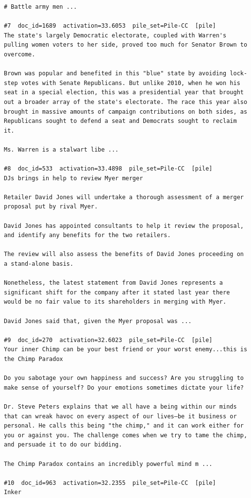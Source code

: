 \begin{verbatim}
# Battle army men ...

#7  doc_id=1689  activation=33.6053  pile_set=Pile-CC  [pile]
The state's largely Democratic electorate, coupled with Warren's pulling women voters to her side, proved too much for Senator Brown to overcome.

Brown was popular and benefited in this "blue" state by avoiding lock-step votes with Senate Republicans. But unlike 2010, when he won his seat in a special election, this was a presidential year that brought out a broader array of the state's electorate. The race this year also brought in massive amounts of campaign contributions on both sides, as Republicans sought to defend a seat and Democrats sought to reclaim it.

Ms. Warren is a stalwart libe ...

#8  doc_id=533  activation=33.4898  pile_set=Pile-CC  [pile]
DJs brings in help to review Myer merger

Retailer David Jones will undertake a thorough assessment of a merger proposal put by rival Myer.

David Jones has appointed consultants to help it review the proposal, and identify any benefits for the two retailers.

The review will also assess the benefits of David Jones proceeding on a stand-alone basis.

Nonetheless, the latest statement from David Jones represents a significant shift for the company after it stated last year there would be no fair value to its shareholders in merging with Myer.

David Jones said that, given the Myer proposal was ...

#9  doc_id=270  activation=32.6023  pile_set=Pile-CC  [pile]
Your inner Chimp can be your best friend or your worst enemy...this is the Chimp Paradox

Do you sabotage your own happiness and success? Are you struggling to make sense of yourself? Do your emotions sometimes dictate your life?

Dr. Steve Peters explains that we all have a being within our minds that can wreak havoc on every aspect of our lives—be it business or personal. He calls this being "the chimp," and it can work either for you or against you. The challenge comes when we try to tame the chimp, and persuade it to do our bidding.

The Chimp Paradox contains an incredibly powerful mind m ...

#10  doc_id=963  activation=32.2355  pile_set=Pile-CC  [pile]
Inker


\end{verbatim}
